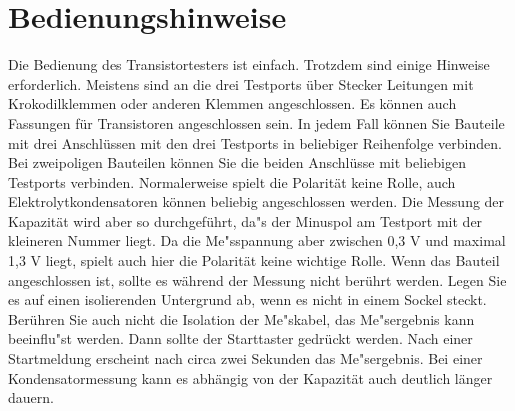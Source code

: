 \chapter{Bedienungshinweise}
\label{sec:manual}
Die Bedienung des Transistortesters ist einfach.
Trotzdem sind einige Hinweise erforderlich.
Meistens sind an die drei Testports \"uber Stecker Leitungen mit Krokodilklemmen oder anderen Klemmen angeschlossen.
Es k\"onnen auch Fassungen f\"ur Transistoren angeschlossen sein.
In jedem Fall k\"onnen Sie Bauteile mit drei Anschl\"ussen mit den drei Testports in beliebiger Reihenfolge verbinden.
Bei zweipoligen Bauteilen k\"onnen Sie die beiden Anschl\"usse mit beliebigen Testports verbinden.
Normalerweise spielt die Polarit\"at keine Rolle, auch Elektrolytkondensatoren k\"onnen beliebig angeschlossen werden.
Die Messung der Kapazit\"at wird aber so durchgef\"uhrt, da"s der Minuspol am Testport mit der kleineren Nummer liegt.
Da die Me"sspannung aber zwischen 0,3 V und maximal 1,3 V liegt, spielt auch hier die Polarit\"at keine wichtige Rolle.
Wenn das Bauteil angeschlossen ist, sollte es w\"ahrend der Messung nicht ber\"uhrt werden. Legen Sie es auf einen
isolierenden Untergrund ab, wenn es nicht in einem Sockel steckt. Ber\"uhren Sie auch nicht die Isolation der Me"skabel,
das Me"sergebnis kann beeinflu"st werden.
Dann sollte der Starttaster gedr\"uckt werden.
Nach einer Startmeldung erscheint nach circa zwei Sekunden das Me"sergebnis. Bei einer Kondensatormessung kann es
abh\"angig von der Kapazit\"at auch deutlich l\"anger dauern.

